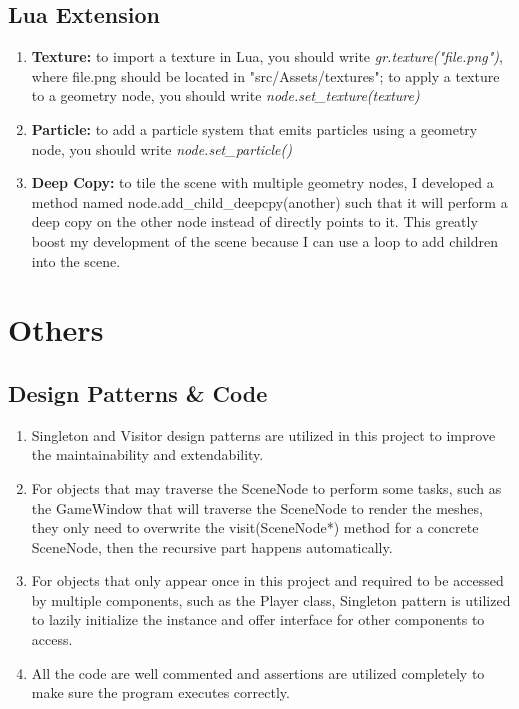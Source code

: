 \documentclass {article}
\begin{document}
\subsection{Lua Extension}
\begin{enumerate}
    \item \textbf{Texture:} to import a texture in Lua, you should write \textit{gr.texture("file.png")}, where file.png should be located in 
    "src/Assets/textures"; to apply a texture to a geometry node, you should write \textit{node.set\_texture(texture)}
    \item \textbf{Particle:} to add a particle system that emits particles using a geometry node, you should write \textit{node.set\_particle()}
    \item \textbf{Deep Copy:} to tile the scene with multiple geometry nodes, I developed a method named node.add\_child\_deepcpy(another) such that it will perform a deep copy on the other node 
    instead of directly points to it. This greatly boost my development of the scene because I can use a loop to add children into the scene.
\end{enumerate}

\newpage

\section{Others}
\subsection{Design Patterns \& Code}
\begin{enumerate}
    \item Singleton and Visitor design patterns are utilized in this project to improve the maintainability and extendability. 
    \item For objects that may traverse the SceneNode to perform some tasks, such as the GameWindow that will traverse the SceneNode to render the meshes,
    they only need to overwrite the visit(SceneNode*) method for a concrete SceneNode, then the recursive part happens automatically. 
    \item For objects that only appear once in this project and required to be accessed by multiple components, such as the Player class, Singleton pattern is utilized
    to lazily initialize the instance and offer interface for other components to access.   
    \item All the code are well commented and assertions are utilized completely to make sure the program executes correctly.
\end{enumerate}
\end{document}
